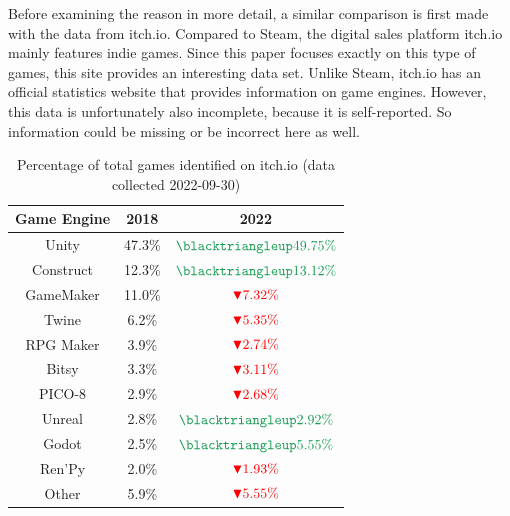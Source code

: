Before examining the reason in more detail, a similar comparison is first made with the data from itch.io.
Compared to Steam, the digital sales platform itch.io mainly features indie games.
Since this paper focuses exactly on this type of games, this site provides an interesting data set.
Unlike Steam, itch.io has an official statistics website that provides information on game engines\cite{itchio-engines}.
However, this data is unfortunately also incomplete, because it is self-reported.
So information could be missing or be incorrect here as well.

\begin{table}[h!]
    \centering
    \begin{tabular}{|c c c|}
        \hline
        Game Engine & 2018   & 2022                                                \\
        \hline\hline
        Unity       & 47.3\% & $\textcolor{ForestGreen}{\blacktriangleup 49.75\%}$ \\
        Construct   & 12.3\% & $\textcolor{ForestGreen}{\blacktriangleup 13.12\%}$ \\
        GameMaker   & 11.0\% & $\textcolor{red}{\blacktriangledown 7.32\%}$        \\
        Twine       & 6.2\%  & $\textcolor{red}{\blacktriangledown 5.35\%}$        \\
        RPG Maker   & 3.9\%  & $\textcolor{red}{\blacktriangledown 2.74\%}$        \\
        Bitsy       & 3.3\%  & $\textcolor{red}{\blacktriangledown 3.11\%}$        \\
        PICO-8      & 2.9\%  & $\textcolor{red}{\blacktriangledown 2.68\%}$        \\
        Unreal      & 2.8\%  & $\textcolor{ForestGreen}{\blacktriangleup 2.92\%}$  \\
        Godot       & 2.5\%  & $\textcolor{ForestGreen}{\blacktriangleup 5.55\%}$  \\
        Ren'Py      & 2.0\%  & $\textcolor{red}{\blacktriangledown 1.93\%}$        \\
        Other       & 5.9\%  & $\textcolor{red}{\blacktriangledown 5.55\%}$        \\
        \hline
    \end{tabular}
    \caption{Percentage of total games identified on itch.io (data collected 2022-09-30)}
    \label{table:itch}
\end{table}

